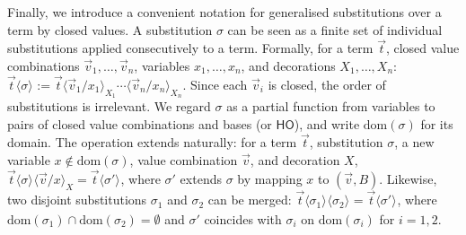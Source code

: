 \documentclass[a4paper,UKenglish,numberwithinsect,pdfa,anonymous]{lipics-v2021}
\theoremstyle{restatestyle}
\newcommand\ansubst[2]{\ensuremath{\langle #1 \rangle_{#2}}}
\newcommand\AbsBasis{\ensuremath{\mathsf{H\!O}}}
\newcommand\dom[1]{\mathrm{dom}(#1)}
\begin{document}
Finally, we introduce a convenient notation for generalised substitutions over
a term by closed values. A substitution $\sigma$ can be seen as a finite set of
individual substitutions applied consecutively to a term. Formally, for a term
$\vec{t}$, closed value combinations $\vec{v}_{1},\dots,\vec{v}_{n}$, variables
$x_1,\dots,x_n$, and decorations $X_1,\dots,X_n$:
\(
  \vec{t}\ansubst{\sigma}{}
  := \vec{t}\ansubst{\vec{v}_{1}/x_1}{X_1}\dotsb\ansubst{\vec{v}_{n}/x_n}{X_n}.
\)
Since each $\vec{v}_{i}$ is closed, the order of substitutions is irrelevant. We
regard $\sigma$ as a partial function from variables to pairs of closed value
combinations and bases (or $\AbsBasis$), and write $\dom{\sigma}$ for its domain.
The operation extends naturally: for a term $\vec{t}$, substitution $\sigma$,
a new variable $x\notin\dom{\sigma}$, value combination $\vec{v}$, and decoration $X$,
\(
  \vec{t}\ansubst{\sigma}{}\ansubst{\vec{v}/x}{X}
  = \vec{t}\ansubst{\sigma'}{}
\),
where $\sigma'$ extends $\sigma$ by mapping $x$ to $(\vec v,B)$. Likewise, two
disjoint substitutions $\sigma_1$ and $\sigma_2$ can be merged:
\(
  \vec{t}\ansubst{\sigma_1}{}\ansubst{\sigma_2}{}
  = \vec{t}\ansubst{\sigma'}{}
\),
where $\dom{\sigma_1}\cap\dom{\sigma_2}=\emptyset$ and $\sigma'$ coincides with
$\sigma_i$ on $\dom{\sigma_i}$ for $i=1,2$.
\end{document}

